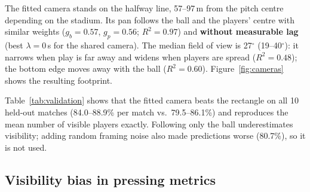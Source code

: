 \documentclass[runningheads]{llncs}
\begin{document}
The fitted camera stands on the halfway line, 57--97\,m from the pitch centre depending on the stadium. Its pan
follows the ball and the players' centre with similar weights ($g_b = 0.57$, $g_p = 0.56$; $R^2 = 0.97$) and
\textbf{without measurable lag} (best $\lambda = 0$\,s for the shared camera). The median field of view is 27$^\circ$
(19--40$^\circ$): it narrows when play is far away and widens when players are spread ($R^2 = 0.48$); the bottom edge moves
away with the ball ($R^2 = 0.60$). Figure~\ref{fig:cameras} shows the resulting footprint.

\begin{table}[t]
\centering
\caption{Which players are on screen? Agreement of each camera model with SkillCorner's per-player detection flags on
10 held-out matches.}
\label{tab:validation}
\end{table}

Table~\ref{tab:validation} shows that the fitted camera beats the rectangle on all 10 held-out matches (84.0--88.9\%
per match vs.\ 79.5--86.1\%) and reproduces the mean number of visible players exactly. Following only the ball
underestimates visibility; adding random framing noise also made predictions worse (80.7\%), so it is not used.

\subsection{Visibility bias in pressing metrics}
\end{document}
